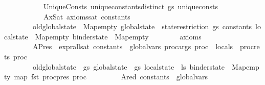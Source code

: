\begin{isabellebody}
\ \ \ \ \ \ \ \ \ \ \ UniqueConsts{\isacharcolon}{\kern0pt}\ {\isachardoublequoteopen}unique{\isacharunderscore}{\kern0pt}constants{\isacharunderscore}{\kern0pt}distinct\ gs\ unique{\isacharunderscore}{\kern0pt}consts{\isachardoublequoteclose}\ \isanewline
\ \ \ \ \ \ \ \ \ \ \ AxSat{\isacharcolon}{\kern0pt}\ {\isachardoublequoteopen}axioms{\isacharunderscore}{\kern0pt}sat\ {\isacharparenleft}{\kern0pt}constants{\isacharcomma}{\kern0pt}\ {\isacharbrackleft}{\kern0pt}{\isacharbrackright}{\kern0pt}{\isacharparenright}{\kern0pt}\ {\isasymGamma}\isanewline
\ \ \ \ \ \ \ \ {\isasymlparr}old{\isacharunderscore}{\kern0pt}global{\isacharunderscore}{\kern0pt}state\ {\isacharequal}{\kern0pt}\ Map{\isachardot}{\kern0pt}empty{\isacharcomma}{\kern0pt}\ global{\isacharunderscore}{\kern0pt}state\ {\isacharequal}{\kern0pt}\ state{\isacharunderscore}{\kern0pt}restriction\ gs\ constants{\isacharcomma}{\kern0pt}\ local{\isacharunderscore}{\kern0pt}state\ {\isacharequal}{\kern0pt}\ Map{\isachardot}{\kern0pt}empty{\isacharcomma}{\kern0pt}\ binder{\isacharunderscore}{\kern0pt}state\ {\isacharequal}{\kern0pt}\ Map{\isachardot}{\kern0pt}empty{\isasymrparr}\isanewline
\ \ \ \ \ \ \ \ axioms{\isachardoublequoteclose}\ \isanewline
\ \ \ \ \ \ \ \ APres{\isacharcolon}{\kern0pt}\ \ {\isachardoublequoteopen}expr{\isacharunderscore}{\kern0pt}all{\isacharunderscore}{\kern0pt}sat\ {\isacharparenleft}{\kern0pt}constants\ {\isacharat}{\kern0pt}\ global{\isacharunderscore}{\kern0pt}vars{\isacharcomma}{\kern0pt}\ proc{\isacharunderscore}{\kern0pt}args\ proc\ {\isacharat}{\kern0pt}\ locals\ {\isacharat}{\kern0pt}\ proc{\isacharunderscore}{\kern0pt}rets\ proc{\isacharparenright}{\kern0pt}\ {\isasymGamma}\ {\isasymOmega}\isanewline
\ \ \ \ \ \ \ \ {\isasymlparr}old{\isacharunderscore}{\kern0pt}global{\isacharunderscore}{\kern0pt}state\ {\isacharequal}{\kern0pt}\ gs{\isacharcomma}{\kern0pt}\ global{\isacharunderscore}{\kern0pt}state\ {\isacharequal}{\kern0pt}\ gs{\isacharcomma}{\kern0pt}\ local{\isacharunderscore}{\kern0pt}state\ {\isacharequal}{\kern0pt}\ ls{\isacharcomma}{\kern0pt}\ binder{\isacharunderscore}{\kern0pt}state\ {\isacharequal}{\kern0pt}\ Map{\isachardot}{\kern0pt}empty{\isasymrparr}\ {\isacharparenleft}{\kern0pt}map\ fst\ {\isacharparenleft}{\kern0pt}proc{\isacharunderscore}{\kern0pt}pres\ proc{\isacharparenright}{\kern0pt}{\isacharparenright}{\kern0pt}{\isachardoublequoteclose}\ \isanewline
\ \ \ \ \ \ \ \ Ared{\isacharcolon}{\kern0pt}\ {\isachardoublequoteopen}{\isacharbrackleft}{\kern0pt}{\isacharbrackright}{\kern0pt}{\isacharcomma}{\kern0pt}{\isacharparenleft}{\kern0pt}constants\ {\isacharat}{\kern0pt}\ global{\isacharunderscore}{\kern0pt}vars{\isacharcomma}{\kern0pt}\isanewline

\end{isabellebody}
